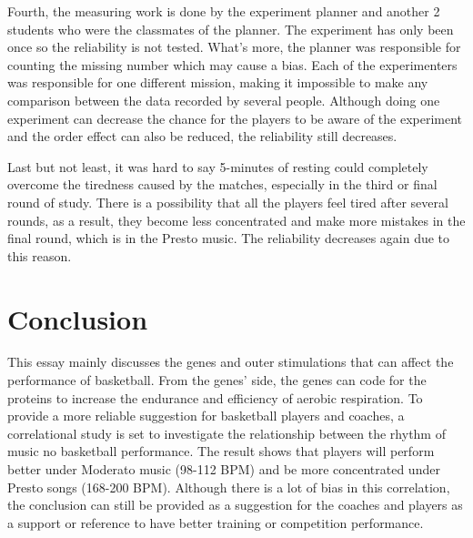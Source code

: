 \documentclass[man,floatsintext]{apa7}
\begin{document}
Fourth, the measuring work is done by the experiment planner and another 2 students who were the classmates of the planner. The experiment has only been once so the reliability is not tested. What's more, the planner was responsible for counting the missing number which may cause a bias. Each of the experimenters was responsible for one different mission, making it impossible to make any comparison between the data recorded by several people. Although doing one experiment can decrease the chance for the players to be aware of the experiment and the order effect can also be reduced, the reliability still decreases.

Last but not least, it was hard to say 5-minutes of resting could completely overcome the tiredness caused by the matches, especially in the third or final round of study. There is a possibility that all the players feel tired after several rounds, as a result, they become less concentrated and make more mistakes in the final round, which is in the Presto music. The reliability decreases again due to this reason.

\section{Conclusion}

This essay mainly discusses the genes and outer stimulations that can affect the performance of basketball. From the genes' side, the genes can code for the proteins to increase the endurance and efficiency of aerobic respiration. To provide a more reliable suggestion for basketball players and coaches, a correlational study is set to investigate the relationship between the rhythm of music no basketball performance. The result shows that players will perform better under Moderato music (98-112 BPM) and be more concentrated under Presto songs (168-200 BPM). Although there is a lot of bias in this correlation, the conclusion can still be provided as a suggestion for the coaches and players as a support or reference to have better training or competition performance.
\newpage
\printbibliography{}
\end{document}
